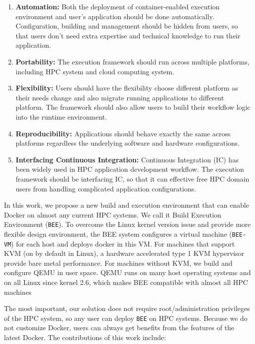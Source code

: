 \begin{enumerate}
\item \textbf{Automation:} 
Both the deployment of container-enabled execution environment and user's application should be done automatically. Configuration, building and management should be hidden from users, so that users don't need extra expertise and technical knowledge to run their application. 
\item \textbf{Portability:}
The execution framework should run across multiple platforms, including HPC system and cloud computing system.
\item \textbf{Flexibility:}
Users should have the flexibility choose different platform as their needs change and also migrate running applications to different platform. The framework should also allow users to build their workflow logic into the runtime environment.
\item \textbf{Reproducibility:}
Applications should behave exactly the same across platforms regardless the underlying software and hardware configurations.
\item \textbf{Interfacing Continuous Integration:}
Continuous Integration (IC) has been widely used in HPC application development workflow. The execution framework should be interfacing IC, so that it can effective free HPC domain users from handling complicated application configurations.  
\end{enumerate}

In this work, we propose a new build and execution environment that can enable Docker on almost any current HPC systems. We call it Build Execution Environment (\texttt{BEE}). To overcome the Linux kernel version issue and provide more flexible design environment, the BEE system configures a virtual machine (\texttt{BEE-VM}) for each host and deploys docker in this VM.  For machines that support KVM (on by default in Linux), a hardware accelerated type 1 KVM hypervisor provide bare metal performance.  For machines without KVM, we build and configure QEMU in user space. QEMU runs on many host operating systems and on all Linux since kernel 2.6, which makes BEE compatible with almost all HPC machines

The most important, our solution does not require root/administration privileges of the HPC system, so any user can deploy \texttt{BEE} on HPC systems. Because we do not customize Docker, users can always get benefits from the features of the latest Docker. The contributions of this work include:


